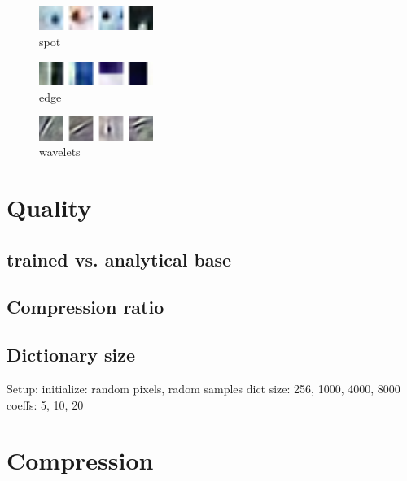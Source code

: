 \begin{figure}
\centering
\includegraphics[width = 0.33\textwidth]{images/spot.png} 
\caption{spot}
\label{fig:spot}
\end{figure}


\begin{figure}
\centering
\includegraphics[width = 0.33\textwidth]{images/edges.png}
\caption{edge}
\label{fig:edge}
\end{figure}

\begin{figure}
\centering
\includegraphics[width = 0.33\textwidth]{images/wavelet.png}
\caption{wavelets}
\label{fig:wavelets}
\end{figure}


\section{Quality}
\subsection*{trained vs. analytical base}
\subsection*{Compression ratio}
\subsection*{Dictionary size}
Setup:
  initialize: random pixels, radom samples 
  dict size: 256, 1000, 4000, 8000
  coeffs: 5, 10, 20

\section{Compression}







